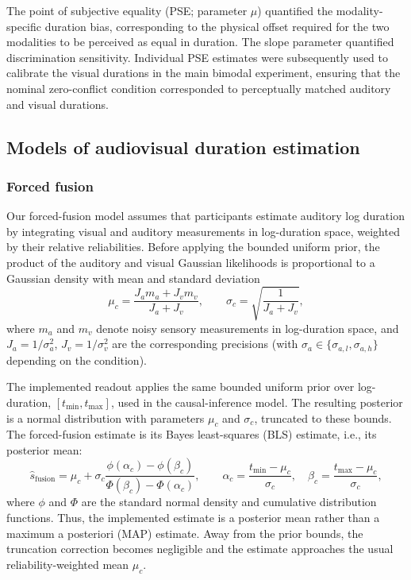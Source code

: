 \documentclass{jov}
\begin{document}
The point of subjective equality (PSE; parameter $\mu$) quantified the modality-specific duration bias, corresponding to the physical offset required for the two modalities to be perceived as equal in duration. The slope parameter quantified discrimination sensitivity. Individual PSE estimates were subsequently used to calibrate the visual durations in the main bimodal experiment, ensuring that the nominal zero-conflict condition corresponded to perceptually matched auditory and visual durations.

\subsection{Models of audiovisual duration estimation}

\subsubsection{Forced fusion}\label{mandatoryFusion}

Our forced-fusion model assumes that participants estimate auditory log duration by integrating visual and auditory measurements in log-duration space, weighted by their relative reliabilities. Before applying the bounded uniform prior, the product of the auditory and visual Gaussian likelihoods is proportional to a Gaussian density with mean and standard deviation
\begin{equation}
\label{eq:forced_fusion}
\mu_c = \frac{J_a m_a + J_v m_v}{J_a + J_v},
\qquad
\sigma_c = \sqrt{\frac{1}{J_a+J_v}},
\end{equation}
where $m_a$ and $m_v$ denote noisy sensory measurements in log-duration space, and $J_a = 1/\sigma_a^2$, $J_v = 1/\sigma_v^2$ are the corresponding precisions (with $\sigma_a \in \{\sigma_{a,l}, \sigma_{a,h}\}$ depending on the condition).

The implemented readout applies the same bounded uniform prior over log-duration, $[t_{\min},t_{\max}]$, used in the causal-inference model. The resulting posterior is a normal distribution with parameters $\mu_c$ and $\sigma_c$, truncated to these bounds. The forced-fusion estimate is its Bayes least-squares (BLS) estimate, i.e., its posterior mean:
\begin{equation}
\hat{s}_{\text{fusion}}
=
\mu_c+\sigma_c
\frac{\phi(\alpha_c)-\phi(\beta_c)}
{\Phi(\beta_c)-\Phi(\alpha_c)},
\qquad
\alpha_c=\frac{t_{\min}-\mu_c}{\sigma_c},
\quad
\beta_c=\frac{t_{\max}-\mu_c}{\sigma_c},
\end{equation}
where $\phi$ and $\Phi$ are the standard normal density and cumulative distribution functions. Thus, the implemented estimate is a posterior mean rather than a maximum a posteriori (MAP) estimate. Away from the prior bounds, the truncation correction becomes negligible and the estimate approaches the usual reliability-weighted mean $\mu_c$.
\end{document}
